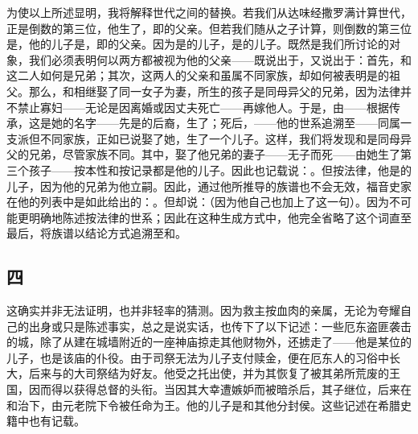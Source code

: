 为使以上所述显明，我将解释世代之间的替换。若我们从达味经撒罗满计算世代，正是倒数的第三位，他生了，即的父亲。但若我们随从之子计算，则倒数的第三位是，他的儿子是，即的父亲。因为是的儿子，是的儿子。既然是我们所讨论的对象，我们必须表明何以两方都被视为他的父亲——既说出于，又说出于：首先，和这二人如何是兄弟；其次，这两人的父亲和虽属不同家族，却如何被表明是的祖父。那么，和相继娶了同一女子为妻，所生的孩子是同母异父的兄弟，因为法律并不禁止寡妇——无论是因离婚或因丈夫死亡——再嫁他人。于是，由——根据传承，这是她的名字——先是的后裔，生了；死后，——他的世系追溯至——同属一支派但不同家族，正如已说娶了她，生了一个儿子。这样，我们将发现和是同母异父的兄弟，尽管家族不同。其中，娶了他兄弟的妻子——无子而死——由她生了第三个孩子——按本性和按记录都是他的儿子。因此也记载说：。但按法律，他是的儿子，因为他的兄弟为他立嗣。因此，通过他所推导的族谱也不会无效，福音史家在他的列表中是如此给出的：。但却说：（因为他自己也加上了这一句）。因为不可能更明确地陈述按法律的世系；因此在这种生成方式中，他完全省略了这个词直至最后，将族谱以结论方式追溯至和。\par


\subsection{四}

这确实并非无法证明，也并非轻率的猜测。因为救主按血肉的亲属，无论为夸耀自己的出身或只是陈述事实，总之是说实话，也传下了以下记述：一些厄东盗匪袭击的城，除了从建在城墙附近的一座神庙掠走其他财物外，还掳走了——他是某位的儿子，也是该庙的仆役。由于司祭无法为儿子支付赎金，便在厄东人的习俗中长大，后来与的大司祭结为好友。他受之托出使，并为其恢复了被其弟所荒废的王国，因而得以获得总督的头衔。当因其大幸遭嫉妒而被暗杀后，其子继位，后来在和治下，由元老院下令被任命为王。他的儿子是和其他分封侯。这些记述在希腊史籍中也有记载。\par

